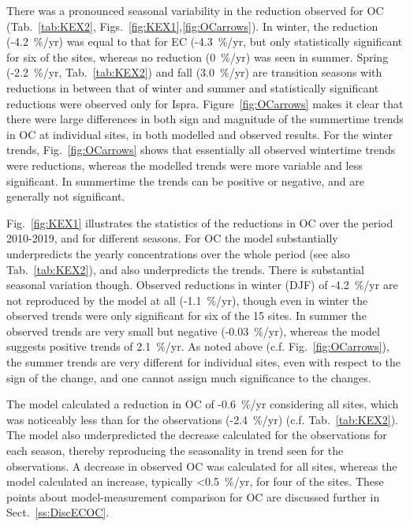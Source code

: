 
There was a pronounced seasonal variability in the reduction observed for
OC (Tab.~\ref{tab:KEX2}, Figs.~\ref{fig:KEX1},\ref{fig:OCarrows}). In winter, the
 reduction (-4.2~\%/yr) was equal to that for
EC (-4.3~\%/yr, but only statistically significant for six of the sites,
whereas no reduction (0~\%/yr) was seen in summer. Spring (-2.2~\%/yr, Tab.~\ref{tab:KEX2}) and fall (3.0~\%/yr) are transition seasons with reductions in between
that of winter and summer and statistically significant reductions were
observed only for Ispra. 
%
Figure~\ref{fig:OCarrows} makes it clear that there were large differences in both sign and magnitude of the summertime trends in OC at individual sites, in both modelled and observed results. For the winter trends, Fig.~\ref{fig:OCarrows} shows that essentially all observed wintertime trends were reductions, whereas the modelled trends were more variable and less significant. In summertime the trends can be positive or negative, and are generally not significant.


Fig.~\ref{fig:KEX1} illustrates the statistics of the reductions in OC  over the period 2010-2019, and for different seasons. For OC the model substantially underpredicts the yearly concentrations over the whole period (see also Tab.~\ref{tab:KEX2}), and also underpredicts the trends. There is substantial seasonal variation though. Observed reductions in winter (DJF) of -4.2~\%/yr are not reproduced by the model at all (-1.1~\%/yr), though even in winter the observed trends were only significant for six of the 15 sites. In summer the observed trends are very small but negative (-0.03~\%/yr), whereas the model suggests positive trends of 2.1~\%/yr. As noted above (c.f. Fig.~\ref{fig:OCarrows}), the summer trends are very different for individual sites, even with respect to the sign of the change, and one cannot assign much significance to the changes. 

The model calculated a
reduction in OC of -0.6~\%/yr considering all sites, which was noticeably
less than for the observations (-2.4~\%/yr) (c.f. Tab.~\ref{tab:KEX2}). The model also underpredicted
the decrease calculated for the observations for each season, thereby
reproducing the seasonality in trend seen for the observations. A decrease
in observed OC was calculated for all sites, whereas the model calculated
an increase, typically <0.5~\%/yr, for four of the sites. These points about model-measurement comparison for OC are discussed further in Sect.~\ref{ss:DiscECOC}.



